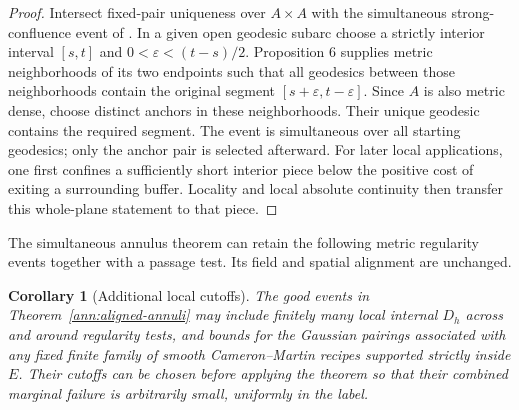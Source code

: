 \documentclass[11pt]{article}
\numberwithin{equation}{section}
\newtheorem{corollary}[theorem]{Corollary}
\theoremstyle{definition}
\theoremstyle{remark}
\newcommand{\1}{\mathbf 1}
\begin{document}
\begin{proof}
Intersect fixed-pair uniqueness over $A\times A$ with the simultaneous
strong-confluence event of
\cite[Theorem 2 and Proposition 6]{BhatiaKavvadiasConfluence}.
In a given open geodesic subarc choose a strictly interior interval
$[s,t]$ and $0<\varepsilon<(t-s)/2$.  Proposition 6 supplies metric
neighborhoods of its two endpoints such that all geodesics between
those neighborhoods contain the original segment
$[s+\varepsilon,t-\varepsilon]$.  Since $A$ is also metric dense,
choose distinct anchors in these neighborhoods.  Their unique
geodesic contains the required segment.  The event is simultaneous
over all starting geodesics; only the anchor pair is selected afterward.
For later local applications, one first confines a sufficiently short
interior piece below the positive cost of exiting a surrounding buffer.
Locality and local absolute continuity then transfer this whole-plane
statement to that piece.
\end{proof}

The simultaneous annulus theorem can retain the following metric
regularity events together with a passage test.  Its field and spatial
alignment are unchanged.

\begin{corollary}[Additional local cutoffs]\label{ann:pairings}
The good events in Theorem~\ref{ann:aligned-annuli} may include
finitely many local internal \(D_h\) across and around regularity
tests, and bounds for the Gaussian pairings associated with any
fixed finite family of smooth Cameron--Martin recipes supported
strictly inside \(E\).  Their cutoffs can be chosen before applying
the theorem so that their combined marginal failure is arbitrarily
small, uniformly in the label.
\end{corollary}
\end{document}
